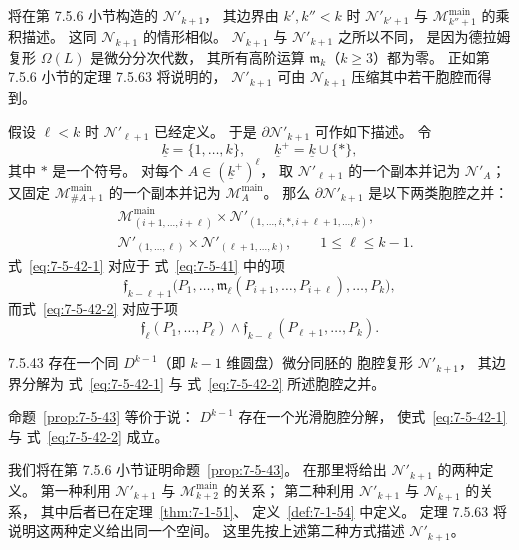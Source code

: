 将在第 7.5.6 小节构造的 $\mathcal N'_{k+1}$，
其边界由 $k',k''<k$ 时
$\mathcal N'_{k'+1}$ 与
$\mathcal M_{k''+1}^{\mathrm{main}}$ 的乘积描述。
这同 $\mathcal N_{k+1}$ 的情形相似。
$\mathcal N_{k+1}$ 与 $\mathcal N'_{k+1}$ 之所以不同，
是因为德拉姆复形 $\Omega(L)$ 是微分分次代数，
其所有高阶运算 $\mathfrak m_k$（$k\geq3$）都为零。
正如第 7.5.6 小节的定理 7.5.63 将说明的，
$\mathcal N'_{k+1}$ 可由 $\mathcal N_{k+1}$
压缩其中若干胞腔而得到。

假设 $\ell<k$ 时 $\mathcal N'_{\ell+1}$ 已经定义。
于是 $\partial\mathcal N'_{k+1}$ 可作如下描述。
令
\[
\underline{k}=\{1,\ldots,k\},
\qquad
\underline{k}^{+}=\underline{k}\cup\{\ast\},
\]
其中 $\ast$ 是一个符号。
对每个 $A\in(\underline{k}^{+})^\ell$，
取 $\mathcal N'_{\ell+1}$ 的一个副本并记为
$\mathcal N'_A$；
又固定 $\mathcal M_{\#A+1}^{\mathrm{main}}$
的一个副本并记为 $\mathcal M_A^{\mathrm{main}}$。
那么 $\partial\mathcal N'_{k+1}$
是以下两类胞腔之并：
\begin{align}
&\mathcal M_{(i+1,\ldots,i+\ell)}^{\mathrm{main}}
\times
\mathcal N'_{(1,\ldots,i,\ast,i+\ell+1,\ldots,k)},
\tag{7.5.42.1}\label{eq:7-5-42-1}\\
&\mathcal N'_{(1,\ldots,\ell)}
\times
\mathcal N'_{(\ell+1,\ldots,k)},
\qquad 1\leq\ell\leq k-1.
\tag{7.5.42.2}\label{eq:7-5-42-2}
\end{align}
式~\eqref{eq:7-5-42-1} 对应于
式~\eqref{eq:7-5-41} 中的项
\[
\mathfrak f_{k-\ell+1}
\bigl(P_1,\ldots,
\mathfrak m_\ell(P_{i+1},\ldots,P_{i+\ell}),
\ldots,P_k\bigr),
\]
而式~\eqref{eq:7-5-42-2} 对应于项
\[
\mathfrak f_\ell(P_1,\ldots,P_\ell)
\wedge
\mathfrak f_{k-\ell}(P_{\ell+1},\ldots,P_k).
\]

\begin{proposition}{7.5.43}\label{prop:7-5-43}
存在一个同 $D^{k-1}$（即 $k-1$ 维圆盘）微分同胚的
胞腔复形 $\mathcal N'_{k+1}$，
其边界分解为
式~\eqref{eq:7-5-42-1} 与
式~\eqref{eq:7-5-42-2} 所述胞腔之并。
\end{proposition}

命题~\ref{prop:7-5-43} 等价于说：
$D^{k-1}$ 存在一个光滑胞腔分解，
使式~\eqref{eq:7-5-42-1} 与
式~\eqref{eq:7-5-42-2} 成立。

我们将在第 7.5.6 小节证明命题~\ref{prop:7-5-43}。
在那里将给出 $\mathcal N'_{k+1}$ 的两种定义。
第一种利用 $\mathcal N'_{k+1}$ 与
$\mathcal M_{k+2}^{\mathrm{main}}$ 的关系；
第二种利用 $\mathcal N'_{k+1}$ 与
$\mathcal N_{k+1}$ 的关系，
其中后者已在定理~\ref{thm:7-1-51}、
定义~\ref{def:7-1-54} 中定义。
定理 7.5.63 将说明这两种定义给出同一个空间。
这里先按上述第二种方式描述 $\mathcal N'_{k+1}$。

